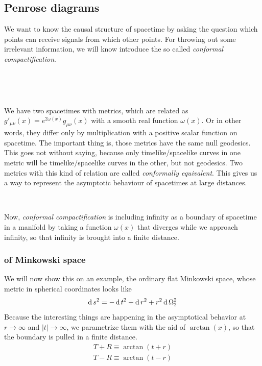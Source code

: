 \subsection{Penrose diagrams}
	We want to know the causal structure of spacetime by asking the question which points can receive signals from which other points. 
For throwing out some irrelevant information, we will know introduce the so called \textit{conformal compactification}.
\parbox{\linewidth}{~}
\hfill
\parbox{0.02\linewidth}{~}
\begin{minipage}[][][c]{0.96\textwidth}
We have two spacetimes with metrics, which are related as $g'_{\mu\nu}(x)=e^{2\omega(x)}g_{\mu\nu}(x)$ with a smooth real function $\omega(x)$. Or in other words, they differ only by multiplication with a positive scalar function on spacetime. The important thing is, those metrics have the same null geodesics.
This goes not without saying, because only timelike/spacelike curves in one metric will be timelike/spacelike curves in the other, but not geodesics.
Two metrics with this kind of relation are called \textit{conformally equivalent}. 
This gives us a way to represent the asymptotic behaviour of spacetimes at large distances.
\end{minipage}
\hfill

\parbox{\linewidth}{~}%

Now, \textit{conformal compactification} is including infinity as a boundary of spacetime in a manifold by taking a function $\omega(x)$ that diverges while we approach infinity, so that infinity is brought into a finite distance.

	\subsubsection{of Minkowski space \checkmark}
		
	We will now show this on an example, the ordinary flat Minkowski space, whose metric in spherical coordinates looks like
		\begin{equation}
			\operatorname{d} s^2=- \operatorname{d} t^2+ \operatorname{d} r^2+r^2 \operatorname{d} \Omega^2_2
		\end{equation}
	Because the interesting things are happening in the asymptotical behavior at $r \rightarrow \infty$ and $|t| \rightarrow \infty$, we parametrize them with the aid of $\arctan(x)$, so that the boundary is pulled in a finite distance.
		\begin{equation}
		\begin{split}
			T+R\equiv\arctan(t+r) \\
			T-R\equiv\arctan(t-r)
		\end{split}
		\end{equation}
	
